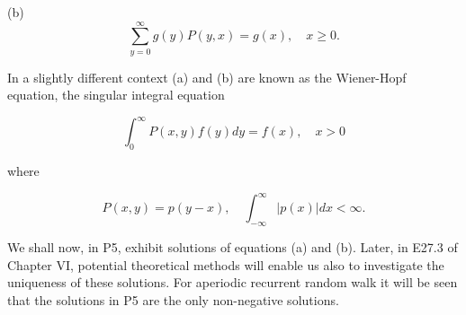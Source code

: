 (b) $$\sum_{y=0}^{\infty} g(y)P(y,x) = g(x), \quad x \geq 0.$$

In a slightly different context (a) and (b) are known as the Wiener-Hopf equation, the singular integral equation

$$\int_{0}^{\infty} P(x,y)f(y) dy = f(x), \quad x > 0$$

where

$$P(x,y) = p(y-x), \quad \int_{-\infty}^{\infty} |p(x)| dx < \infty.$$

We shall now, in P5, exhibit solutions of equations (a) and (b). Later, in E27.3 of Chapter VI, potential theoretical methods will enable us also to investigate the uniqueness of these solutions. For aperiodic recurrent random walk it will be seen that the solutions in P5 are the only non-negative solutions.